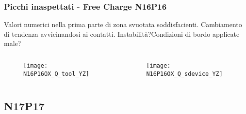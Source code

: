 \begin{frame}
\frametitle{Picchi inaspettati - Free Charge N16P16}
Valori numerici nella prima parte di zona svuotata soddisfacienti. Cambiamento di tendenza avvicinandosi ai contatti. Instabilit\`a?Condizioni di bordo applicate male?
\begin{columns}

\begin{column}{0.5 \textwidth}
\begin{center}
\begin{figure}[!h]
          {\texttt{[image: N16P16OX\_Q\_tool\_YZ]}}
          \end{figure}
\end{center}
\end{column}

\begin{column}{0.5 \textwidth}
\begin{center}
\begin{figure}[!h]
          {\texttt{[image: N16P16OX\_Q\_sdevice\_YZ]}}
\end{figure}
\end{center}
\end{column}

\end{columns}

\end{frame}

\subsection{N17P17}
\begin{frame}
\tableofcontents[currentsection]
\end{frame}

